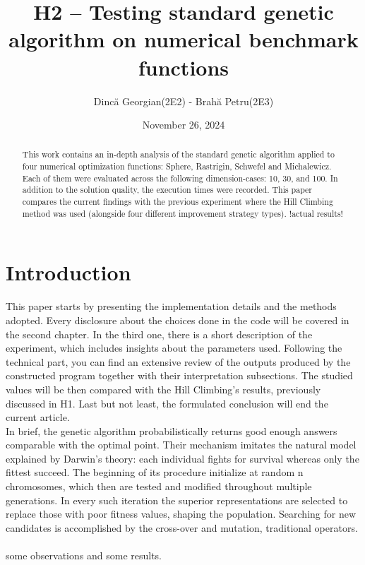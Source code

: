 \documentclass{article}
\title{H2 – Testing standard genetic algorithm on numerical benchmark functions}
\author{Dincă Georgian(2E2) - Brahă Petru(2E3)}
\date{November 26, 2024}
\begin{document}
\maketitle

\begin{abstract}

This work contains an in-depth analysis of the standard genetic algorithm applied to four numerical optimization functions: Sphere, Rastrigin, Schwefel and Michalewicz. Each of them were evaluated across the following dimension-cases: 10, 30, and 100. In addition to the solution quality, the execution times were recorded. This paper compares the current findings with the previous experiment where the Hill Climbing method was used (alongside four different improvement strategy types). !actual results!

\end{abstract}

\section{Introduction}

This paper starts by presenting the implementation details and the methods adopted. Every disclosure about the choices done in the code will be covered in the second chapter. In the third one, there is a short description of the experiment, which includes insights about the parameters used. Following the technical part, you can find an extensive review of the outputs produced by the constructed program together with their interpretation subsections. The studied values will be then compared with the Hill Climbing's results, previously discussed in H1. Last but not least, the formulated conclusion will end the current article.\\

In brief, the genetic algorithm probabilistically returns good enough answers comparable with the optimal point. Their mechanism imitates the natural model explained by Darwin's theory: each individual fights for survival whereas only the fittest succeed. The beginning of its procedure initialize at random n chromosomes, which then are tested and modified throughout multiple generations. In every such iteration the superior representations are selected to replace those with poor fitness values, shaping the population. Searching for new candidates is accomplished by the cross-over and mutation, traditional operators. 

\paragraph{}
some observations and some results.
\end{document}
